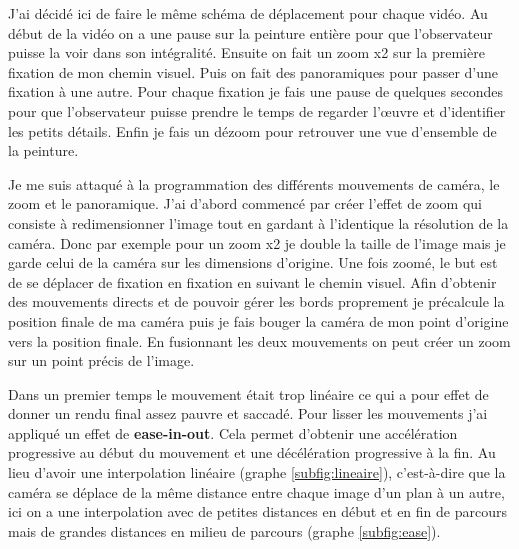 \par
J'ai décidé ici de faire le même schéma de déplacement pour chaque vidéo. Au début de la vidéo on a une pause sur la peinture entière pour que l'observateur puisse la voir dans son intégralité. Ensuite on fait un zoom x2 sur la première fixation de mon chemin visuel. Puis on fait des panoramiques pour passer d'une fixation à une autre. Pour chaque fixation je fais une pause de quelques secondes pour que l'observateur puisse prendre le temps de regarder l'\oe uvre et d'identifier les petits détails. Enfin je fais un dézoom pour retrouver une vue d'ensemble de la peinture.

\par
Je me suis attaqué à la programmation des différents mouvements de caméra, le zoom et le panoramique. J'ai d'abord commencé par créer l'effet de zoom qui consiste à redimensionner l'image tout en gardant à l'identique la résolution de la caméra. Donc par exemple pour un zoom x2 je double la taille de l'image mais je garde celui de la caméra sur les dimensions d'origine. Une fois zoomé, le but est de se déplacer de fixation en fixation en suivant le chemin visuel. Afin d'obtenir des mouvements directs et de pouvoir gérer les bords proprement je précalcule la position finale de ma caméra puis je fais bouger la caméra de mon point d'origine vers la position finale. En fusionnant les deux mouvements on peut créer un zoom sur un point précis de l'image.

\par
Dans un premier temps le mouvement était trop linéaire ce qui a pour effet de donner un rendu final assez pauvre et saccadé. Pour lisser les mouvements j'ai appliqué un effet de \textbf{ease-in-out}. Cela permet d'obtenir une accélération progressive au début du mouvement et une décélération progressive à la fin. Au lieu d'avoir une interpolation linéaire (graphe \ref{subfig:lineaire}), c'est-à-dire que la caméra se déplace de la même distance entre chaque image d'un plan à un autre, ici on a une interpolation avec de petites distances en début et en fin de parcours mais de grandes distances en milieu de parcours (graphe \ref{subfig:ease}).

